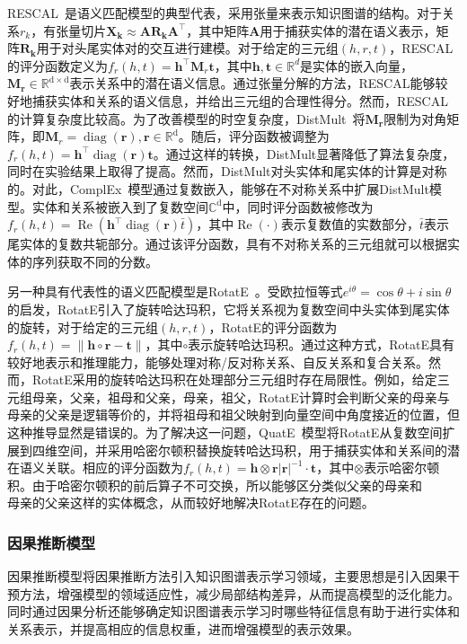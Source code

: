 \documentclass[algorithmlist, AutoFakeBold, AutoFakeSlant, figurelist, tablelist, nomlist, masters]{seuthesix}
\begin{document}
RESCAL~\cite{nickel2011three}是语义匹配模型的典型代表，采用张量来表示知识图谱的结构。对于关系$r_k$，有张量切片$\mathbf{X_k} \approx \mathbf{A R_k A^{\top}}$，其中矩阵$\mathbf{A}$用于捕获实体的潜在语义表示，矩阵$\mathbf{R_k}$用于对头尾实体对的交互进行建模。对于给定的三元组$\left(h, r, t\right)$，RESCAL的评分函数定义为$f_r(h, t)=\bm{h}^{\top} \mathbf{M}_r \bm{t}$，其中$\bm{h}, \bm{t} \in \mathbb{R}^d$是实体的嵌入向量，$\bm{M}_{\bm{r}} \in \mathbb{R}^\mathrm{d \times d}$表示关系中的潜在语义信息。通过张量分解的方法，RESCAL能够较好地捕获实体和关系的语义信息，并给出三元组的合理性得分。然而，RESCAL的计算复杂度比较高。为了改善模型的时空复杂度，DistMult~\cite{yang2015embedding}将$\mathbf{M_r}$限制为对角矩阵，即$\mathbf{M}_r=\operatorname{diag}(\bm{r}), \bm{r} \in \mathbb{R}^\mathrm{d}$。随后，评分函数被调整为$f_r(h, t)=\bm{h}^{\top} \operatorname{diag}(\bm{r}) \bm{t}$。通过这样的转换，DistMult显著降低了算法复杂度，同时在实验结果上取得了提高。然而，DistMult对头实体和尾实体的计算是对称的。对此，ComplEx~\cite{trouillon2016complex}模型通过复数嵌入，能够在不对称关系中扩展DistMult模型。实体和关系被嵌入到了复数空间$\mathbb{C}^\mathrm{d}$中，同时评分函数被修改为$f_r(h, t)=\operatorname{Re}\left(\bm{h}^{\top} \operatorname{diag}(\bm{r}) \bar{t}\right)$，其中$\operatorname{Re}(\cdot)$表示复数值的实数部分，$\bar{t}$表示尾实体的复数共轭部分。通过该评分函数，具有不对称关系的三元组就可以根据实体的序列获取不同的分数。

另一种具有代表性的语义匹配模型是RotatE~\cite{sun2018rotate}。受欧拉恒等式$e^{i \theta}=\cos \theta + i \sin \theta$的启发，RotatE引入了旋转哈达玛积，它将关系视为复数空间中头实体到尾实体的旋转，对于给定的三元组$\left(h, r, t\right)$，RotatE的评分函数为$f_r(h, t) = \|\bm{h} \circ \bm{r} - \bm{t}\|$，其中$\circ$表示旋转哈达玛积。通过这种方式，RotatE具有较好地表示和推理能力，能够处理对称/反对称关系、自反关系和复合关系。然而，RotatE采用的旋转哈达玛积在处理部分三元组时存在局限性。例如，给定三元组$\mbox{母亲，父亲，祖母}$和$\mbox{父亲，母亲，祖父}$，RotatE计算时会判断$\mbox{父亲的母亲}$与$\mbox{母亲的父亲}$是逻辑等价的，并将$\mbox{祖母}$和$\mbox{祖父}$映射到向量空间中角度接近的位置，但这种推导显然是错误的。为了解决这一问题，QuatE~\cite{zhang2019quaternion}模型将RotatE从复数空间扩展到四维空间，并采用哈密尔顿积替换旋转哈达玛积，用于捕获实体和关系间的潜在语义关联。相应的评分函数为$f_r(h, t)=\bm{h} \otimes \bm{r}|\bm{r}|^{-1} \cdot \bm{t}$，其中$\otimes$表示哈密尔顿积。由于哈密尔顿积的前后算子不可交换，所以能够区分类似$父亲的母亲$和$母亲的父亲$这样的实体概念，从而较好地解决RotatE存在的问题。

\subsubsection{因果推断模型}
因果推断模型将因果推断方法引入知识图谱表示学习领域，主要思想是引入因果干预方法，增强模型的领域适应性，减少局部结构差异，从而提高模型的泛化能力。同时通过因果分析还能够确定知识图谱表示学习时哪些特征信息有助于进行实体和关系表示，并提高相应的信息权重，进而增强模型的表示效果。
\end{document}
